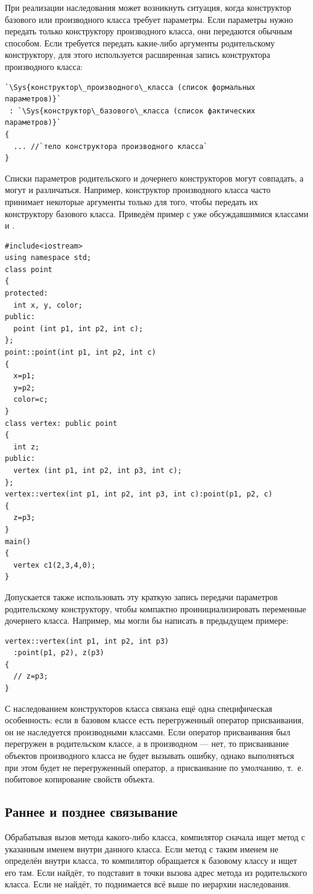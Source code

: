 При реализации наследования может возникнуть ситуация, когда конструктор базового или производного класса требует
параметры. Если параметры нужно передать только конструктору производного класса, они передаются обычным способом. Если
требуется передать какие-либо аргументы родительскому конструктору, для этого используется расширенная запись
конструктора производного класса:
\begin{lstlisting}
`\Sys{конструктор\_производного\_класса (список формальных параметров)}`
 : `\Sys{конструктор\_базового\_класса (список фактических параметров)}`
{
  ... //`тело конструктора производного класса`
}
\end{lstlisting}

Списки параметров родительского и дочернего конструкторов могут совпадать, а могут и различаться. Например, конструктор
производного класса часто принимает некоторые аргументы только для того, чтобы передать их конструктору базового
класса. Приведём пример с уже обсуждавшимися классами  и .
\begin{lstlisting}
#include<iostream>
using namespace std;
class point 
{
protected:
  int x, y, color;
public:
  point (int p1, int p2, int c);
};
point::point(int p1, int p2, int c) 
{
  x=p1; 
  y=p2;
  color=c;
}
class vertex: public point 
{
  int z;
public:
  vertex (int p1, int p2, int p3, int c);
};
vertex::vertex(int p1, int p2, int p3, int c):point(p1, p2, c) 
{ 
  z=p3; 
}
main() 
{
  vertex c1(2,3,4,0);
}
\end{lstlisting}

Допускается также использовать эту краткую запись передачи параметров родительскому конструктору, чтобы компактно
проинициализировать переменные дочернего класса. Например, мы могли бы написать в предыдущем примере:
\begin{lstlisting}
vertex::vertex(int p1, int p2, int p3)
  :point(p1, p2), z(p3) 
{ 
  // z=p3;
}
\end{lstlisting}

С наследованием конструкторов класса связана ещё одна специфическая особенность: если в базовом классе есть
перегруженный оператор присваивания, он не наследуется производными классами. Если оператор присваивания был перегружен
в родительском классе, а в производном --- нет, то присваивание объектов производного класса не будет вызывать ошибку,
однако выполняться при этом будет не перегруженный оператор, а присваивание по умолчанию, т.~е. побитовое копирование
свойств объекта.

\subsection[Раннее и позднее связывание]{Раннее и позднее связывание}
Обрабатывая вызов метода какого-либо класса, компилятор сначала ищет метод с указанным именем внутри данного класса.
Если метод с таким именем не определён внутри класса, то компилятор обращается к базовому классу и ищет его там. Если
найдёт, то подставит в точки вызова адрес метода из родительского класса. Если не найдёт, то поднимается всё выше по
иерархии наследования.

